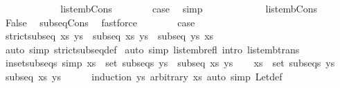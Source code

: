\begin{isabellebody}
\ \ \ \ \isamarkupfalse%
\isanewline
\ \ \ \ \ \ \isamarkupfalse%
\ list{\isacharunderscore}emb{\isacharunderscore}Cons{}\isanewline
\ \ \ \ \ \ \isamarkupfalse%
\ {\isacharquery}case\ \isamarkupfalse%
\ simp\isanewline
\ \ \ \ \isamarkupfalse%
\isanewline
\ \ \ \ \ \ \isamarkupfalse%
\ list{\isacharunderscore}emb{\isacharunderscore}Cons\isanewline
\ \ \ \ \ \ \isamarkupfalse%
\ False\ \isamarkupfalse%
\ subseq{\isacharunderscore}Cons{\isacharprime}\ \isamarkupfalse%
\ fastforce\isanewline
\ \ \ \ \ \ \isamarkupfalse%
\ {\isacharquery}case\ \isacommand{{\isachardot}{\isachardot}}\isamarkupfalse%
\isanewline
\ \ \ \ \isamarkupfalse%
\isanewline
\ \ \isacommand{{\isacharbraceright}}\isamarkupfalse%
\isanewline
\ \ \isamarkupfalse%
\ {\isachardoublequoteopen}strict{\isacharunderscore}subseq\ xs\ ys\ {\isasymlongleftrightarrow}\ {\isacharparenleft}subseq\ xs\ ys\ {\isasymand}\ {\isasymnot}subseq\ ys\ xs{\isacharparenright}{\isachardoublequoteclose}\isanewline
\ \ \ \ \isamarkupfalse%
\ {\isacharparenleft}auto\ simp{\isacharcolon}\ strict{\isacharunderscore}subseq{\isacharunderscore}def{\isacharparenright}\isanewline
{}\isamarkupfalse%
\ {\isacharparenleft}auto\ simp{\isacharcolon}\ list{\isacharunderscore}emb{\isacharunderscore}refl\ intro{\isacharcolon}\ list{\isacharunderscore}emb{\isacharunderscore}trans{\isacharparenright}%
\endisatagproof
{\isafoldproof}%
%
\isadelimproof
\isanewline
%
\endisadelimproof
\isanewline
{}\isamarkupfalse%
\ in{\isacharunderscore}set{\isacharunderscore}subseqs\ {\isacharbrackleft}simp{\isacharbrackright}{\isacharcolon}\ {\isachardoublequoteopen}xs\ {\isasymin}\ set\ {\isacharparenleft}subseqs\ ys{\isacharparenright}\ {\isasymlongleftrightarrow}\ subseq\ xs\ ys{\isachardoublequoteclose}\isanewline
%
\isadelimproof
%
\endisadelimproof
%
\isatagproof
{}\isamarkupfalse%
\isanewline
\ \ \isamarkupfalse%
\ {\isachardoublequoteopen}xs\ {\isasymin}\ set\ {\isacharparenleft}subseqs\ ys{\isacharparenright}{\isachardoublequoteclose}\isanewline
\ \ \isamarkupfalse%
\ {\isachardoublequoteopen}subseq\ xs\ ys{\isachardoublequoteclose}\isanewline
\ \ \ \ \isamarkupfalse%
\ {\isacharparenleft}induction\ ys\ arbitrary{\isacharcolon}\ xs{\isacharparenright}\ {\isacharparenleft}auto\ simp{\isacharcolon}\ Let{\isacharunderscore}def{\isacharparenright}\isanewline

\end{isabellebody}
